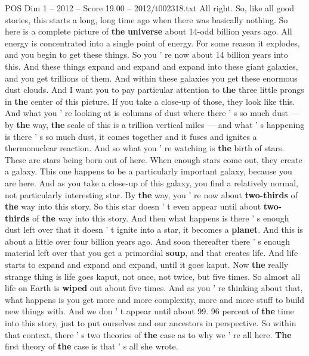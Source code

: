\begin{textsample}{POS Dim 1 – 2012 – Score 19.00 – 2012/t002318.txt}  \label{ex:f1_pos_038}
All right.
So, like all good stories, this starts a long, long time ago when there was basically nothing.
So here is a complete picture of \textbf{the} \textbf{universe} about 14-odd billion years ago.
All energy is concentrated into a single point of energy.
For some reason it explodes, and you begin to get these things.
So you ' re now about 14 billion years into this.
And these things expand and expand and expand into these giant galaxies, and you get trillions of them.
And within these galaxies you get these enormous dust clouds.
And I want you to pay particular attention to \textbf{the} three little prongs in \textbf{the} center of this picture.
If you take a close-up of those, they look like this.
And what you ' re looking at is columns of dust where there ' s so much dust — by \textbf{the} way, \textbf{the} scale of this is a trillion vertical miles — and what ' s happening is there ' s so much dust, it comes together and it fuses and ignites a thermonuclear reaction.
And so what you ' re watching is \textbf{the} birth of stars.
These are stars being born out of here.
When enough stars come out, they create a galaxy.
This one happens to be a particularly important galaxy, because you are here.
And as you take a close-up of this galaxy, you find a relatively normal, not particularly interesting star.
By \textbf{the} way, you ' re now about \textbf{two-thirds} of \textbf{the} way into this story.
So this star doesn ' t even appear until about \textbf{two-thirds} of \textbf{the} way into this story.
And then what happens is there ' s enough dust left over that it doesn ' t ignite into a star, it becomes a \textbf{planet}.
And this is about a little over four billion years ago.
And soon thereafter there ' s enough material left over that you get a primordial \textbf{soup}, and that creates life.
And life starts to expand and expand and expand, until it goes kaput.
Now \textbf{the} really strange thing is life goes kaput, not once, not twice, but five times.
So almost all life on Earth is \textbf{wiped} out about five times.
And as you ' re thinking about that, what happens is you get more and more complexity, more and more stuff to build new things with.
And we don ' t appear until about 99. 96 percent of \textbf{the} time into this story, just to put ourselves and our ancestors in perspective.
So within that context, there ' s two theories of \textbf{the} case as to why we ' re all here. \textbf{The} first theory of \textbf{the} case is that ' s all she wrote.

\end{textsample}
